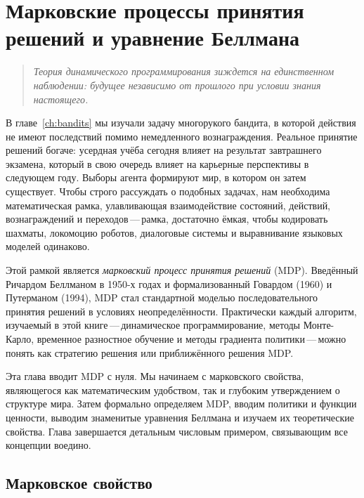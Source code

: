 \chapter[MDP и уравнение Беллмана]{Марковские процессы принятия решений и уравнение Беллмана}
\label{ch:mdp}

\begin{quote}
\itshape
Теория динамического программирования зиждется на единственном наблюдении: будущее независимо от прошлого при условии знания настоящего.
\end{quote}

\bigskip

В главе~\ref{ch:bandits} мы изучали задачу многорукого бандита, в которой действия не имеют последствий помимо немедленного вознаграждения. Реальное принятие решений богаче: усердная учёба сегодня влияет на результат завтрашнего экзамена, который в свою очередь влияет на карьерные перспективы в следующем году. Выборы агента формируют мир, в котором он затем существует. Чтобы строго рассуждать о подобных задачах, нам необходима математическая рамка, улавливающая взаимодействие состояний, действий, вознаграждений и переходов\,---\,рамка, достаточно ёмкая, чтобы кодировать шахматы, локомоцию роботов, диалоговые системы и выравнивание языковых моделей одинаково.

Этой рамкой является \emph{марковский процесс принятия решений} (MDP). Введённый Ричардом Беллманом в 1950-х годах и формализованный Говардом (1960) и Путерманом (1994), MDP стал стандартной моделью последовательного принятия решений в условиях неопределённости. Практически каждый алгоритм, изучаемый в этой книге\,---\,динамическое программирование, методы Монте-Карло, временное разностное обучение и методы градиента политики\,---\,можно понять как стратегию решения или приближённого решения MDP.

Эта глава вводит MDP с нуля. Мы начинаем с марковского свойства, являющегося как математическим удобством, так и глубоким утверждением о структуре мира. Затем формально определяем MDP, вводим политики и функции ценности, выводим знаменитые уравнения Беллмана и изучаем их теоретические свойства. Глава завершается детальным числовым примером, связывающим все концепции воедино.


\section{Марковское свойство}
\label{sec:markov-property}


